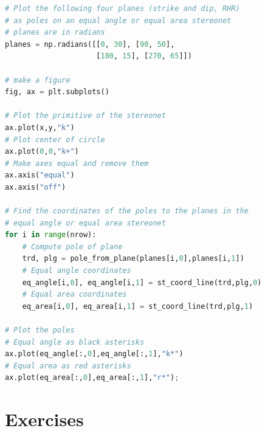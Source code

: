 \documentclass[a4paper , 12pt]{book}
\begin{document}
\begin{center}
\begin{lstlisting}[language=Python, frame=single]
# Plot the following four planes (strike and dip, RHR)
# as poles on an equal angle or equal area stereonet
# planes are in radians
planes = np.radians([[0, 30], [90, 50], 
                     [180, 15], [270, 65]])

# make a figure
fig, ax = plt.subplots()

# Plot the primitive of the stereonet
ax.plot(x,y,"k")
# Plot center of circle
ax.plot(0,0,"k+")
# Make axes equal and remove them
ax.axis("equal")
ax.axis("off")

# Find the coordinates of the poles to the planes in the
# equal angle or equal area stereonet
for i in range(nrow):
    # Compute pole of plane
    trd, plg = pole_from_plane(planes[i,0],planes[i,1])
    # Equal angle coordinates
    eq_angle[i,0], eq_angle[i,1] = st_coord_line(trd,plg,0) 
    # Equal area coordinates
    eq_area[i,0], eq_area[i,1] = st_coord_line(trd,plg,1)

# Plot the poles
# Equal angle as black asterisks
ax.plot(eq_angle[:,0],eq_angle[:,1],"k*")
# Equal area as red asterisks
ax.plot(eq_area[:,0],eq_area[:,1],"r*");
\end{lstlisting}
\end{center}

\section{Exercises} \label{exercises3}
\end{document}
